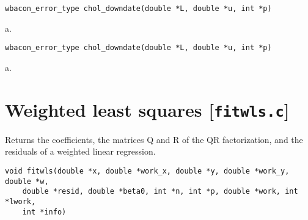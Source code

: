 \documentclass[a4paper,oneside,10pt,DIV=12]{scrreprt}
\begin{document}
\begin{Description}
\end{Description}
\begin{Usage}
\begin{verbatim}
wbacon_error_type chol_downdate(double *L, double *u, int *p)
\end{verbatim}
\end{Usage}
\begin{Arguments}
	\begin{ldescription}
		\item[\code{x}] a.
	\end{ldescription}
\end{Arguments}
\begin{Value}
\end{Value}


\begin{Description}
\end{Description}
\begin{Usage}
\begin{verbatim}
wbacon_error_type chol_downdate(double *L, double *u, int *p)
\end{verbatim}
\end{Usage}
\begin{Arguments}
	\begin{ldescription}
		\item[\code{x}] a.
	\end{ldescription}
\end{Arguments}
\begin{Value}
\end{Value}


\chapter{Weighted least squares [\texttt{fitwls.c}]}
\begin{Description}
	Returns the coefficients, the matrices Q and R of the QR factorization, and
	the residuals of a weighted linear regression.
\end{Description}
\begin{Usage}
\begin{verbatim}
void fitwls(double *x, double *work_x, double *y, double *work_y, double *w,
    double *resid, double *beta0, int *n, int *p, double *work, int *lwork,
    int *info)
\end{verbatim}
\end{Usage}
\end{document}
